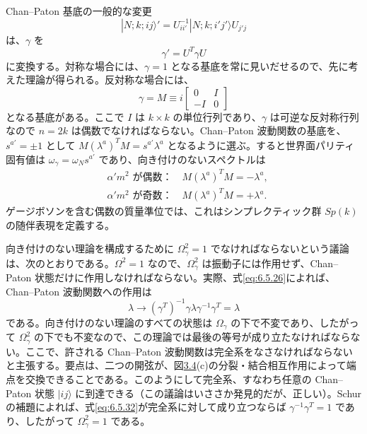 Chan--Paton 基底の一般的な変更
\begin{equation}
|N;k;ij\rangle'=U^{-1}_{ii'}|N;k;i'j'\rangle U_{j'j}
\tag{6.5.28}\label{eq:6.5.28}
\end{equation}
は、$\gamma$ を
\begin{equation}
\gamma'=U^T\gamma U
\tag{6.5.29}\label{eq:6.5.29}
\end{equation}
に変換する。対称な場合には、$\gamma=1$ となる基底を常に見いだせるので、先に考えた理論が得られる。反対称な場合には、
\begin{equation}
\gamma=M\equiv i
\begin{bmatrix}0&I\\-I&0\end{bmatrix}
\tag{6.5.30}\label{eq:6.5.30}
\end{equation}
となる基底がある。ここで $I$ は $k\times k$ の単位行列であり、$\gamma$ は可逆な反対称行列なので $n=2k$ は偶数でなければならない。Chan--Paton 波動関数の基底を、$s^{a'}=\pm1$ として
$M(\lambda^a)^TM=s^{a'}\lambda^a$
となるように選ぶ。すると世界面パリティ固有値は $\omega_\gamma=\omega_Ns^{a'}$ であり、向き付けのないスペクトルは
\begin{align}
&\alpha'm^2\text{ が偶数：}\quad M(\lambda^a)^TM=-\lambda^a,
\tag{6.5.31a}\label{eq:6.5.31a}\\
&\alpha'm^2\text{ が奇数：}\quad M(\lambda^a)^TM=+\lambda^a.
\tag{6.5.31b}\label{eq:6.5.31b}
\end{align}
ゲージボソンを含む偶数の質量準位では、これはシンプレクティック群 $Sp(k)$ の随伴表現を定義する。

向き付けのない理論を構成するために $\Omega_\gamma^2=1$ でなければならないという議論は、次のとおりである。$\Omega^2=1$ なので、$\Omega_\gamma^2$ は振動子には作用せず、Chan--Paton 状態だけに作用しなければならない。実際、式\eqref{eq:6.5.26}によれば、Chan--Paton 波動関数への作用は
\begin{equation}
\lambda\longrightarrow(\gamma^T)^{-1}\gamma\lambda\gamma^{-1}\gamma^T=\lambda
\tag{6.5.32}\label{eq:6.5.32}
\end{equation}
である。向き付けのない理論のすべての状態は $\Omega_\gamma$ の下で不変であり、したがって $\Omega_\gamma^2$ の下でも不変なので、この理論では最後の等号が成り立たなければならない。ここで、許される Chan--Paton 波動関数は完全系をなさなければならないと主張する。要点は、二つの開弦が、図\hyperref[fig:3.4]{3.4}(c)の分裂・結合相互作用によって端点を交換できることである。このようにして完全系、すなわち任意の Chan--Paton 状態 $|ij\rangle$ に到達できる（この議論はいささか発見的だが、正しい）。Schur の補題によれば、式\eqref{eq:6.5.32}が完全系に対して成り立つならば $\gamma^{-1}\gamma^T=1$ であり、したがって $\Omega_\gamma^2=1$ である。

